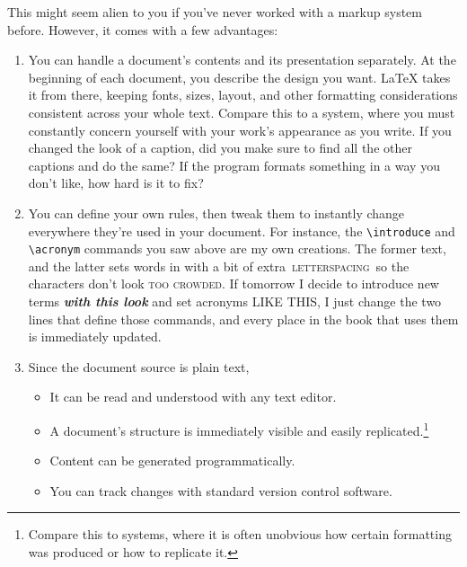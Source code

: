 This might seem alien to you if you've never worked with a markup system before.
However, it comes with a few advantages:
\begin{enumerate}
\item You can handle a document's contents and its presentation separately.
    At the beginning of each document,
    you describe the design you want.
    \LaTeX{} takes it from there,
    keeping fonts, sizes, layout,
    and other formatting considerations consistent across your
    whole text.
    Compare this to a  system,
    where you must constantly concern yourself with your work's appearance
    as you write.
    If you changed the look of a caption,
    did you make sure to find all the other captions and do the
    same?
    If the program formats something in a way you don't like,
    how hard is it to fix?%
\clearpage

\item You can define your own rules, then tweak them to instantly change
    everywhere they're used in your document.
    For instance, the \verb|\introduce| and \verb|\acronym| commands you saw above
    are my own creations. The former  text, and
    the latter sets words in  with a bit of extra
    \,\textsc{letterspacing}\, so the characters
    don't look \textsc{too crowded}.
    If tomorrow I decide to introduce new terms
    \textbf{\itshape with this look} and set acronyms
    {\small{} LIKE THIS},
    I just change the two lines that define those commands,
    and every place in the book that uses them is immediately updated.

\item Since the document source is plain text,
    \begin{itemize}
    \item It can be read and understood with any text editor.
    \item A document's structure is immediately visible
        and easily replicated.\punckern\footnote{Compare this to
         systems, where it is often unobvious
        how certain formatting was produced or how to replicate it.}
    \item Content can be generated programmatically.
    \item You can track changes with standard version control software.
    \end{itemize}
\end{enumerate}

